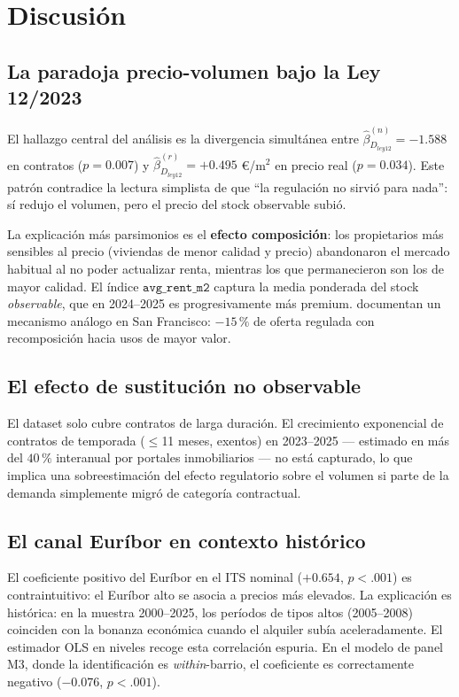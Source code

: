 \documentclass[10pt,a4paper,twocolumn]{article}
\begin{document}
\section{Discusión}
\label{sec:discusion}

\subsection{La paradoja precio-volumen bajo la Ley 12/2023}

El hallazgo central del análisis es la divergencia simultánea entre
$\hat{\beta}_{D_{ley12}}^{(n)}{=}{-}1.588$ en contratos ($p{=}0.007$) y
$\hat{\beta}_{D_{ley12}}^{(r)}{=}{+}0.495$ \euro/m$^2$ en precio real
($p{=}0.034$). Este patrón contradice la lectura simplista de que ``la regulación
no sirvió para nada'': sí redujo el volumen, pero el precio del stock observable subió.

La explicación más parsimonios es el \textbf{efecto composición}: los propietarios
más sensibles al precio (viviendas de menor calidad y precio) abandonaron el mercado
habitual al no poder actualizar renta, mientras los que permanecieron son los de
mayor calidad. El índice $\texttt{avg\_rent\_m2}$ captura la media ponderada del
stock \textit{observable}, que en 2024--2025 es progresivamente más premium.
\citet{diamond2019rent} documentan un mecanismo análogo en San Francisco: $-15\,\%$
de oferta regulada con recomposición hacia usos de mayor valor.

\subsection{El efecto de sustitución no observable}

El dataset solo cubre contratos de larga duración. El crecimiento exponencial de
contratos de temporada ($\leq$11 meses, exentos) en 2023--2025 --- estimado en más
del $40\,\%$ interanual por portales inmobiliarios --- no está capturado, lo que
implica una sobreestimación del efecto regulatorio sobre el volumen si parte de la
demanda simplemente migró de categoría contractual.

\subsection{El canal Euríbor en contexto histórico}

El coeficiente positivo del Euríbor en el ITS nominal ($+0.654$, $p{<}.001$) es
contraintuitivo: el Euríbor alto se asocia a precios más elevados. La explicación es
histórica: en la muestra 2000--2025, los períodos de tipos altos (2005--2008) coinciden
con la bonanza económica cuando el alquiler subía aceleradamente. El estimador OLS en
niveles recoge esta correlación espuria. En el modelo de panel M3, donde la
identificación es \textit{within}-barrio, el coeficiente es correctamente negativo
($-0.076$, $p{<}.001$).
\end{document}
